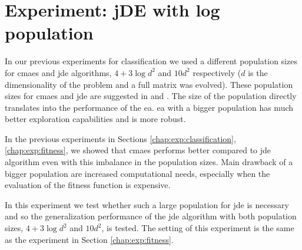 \documentclass[12pt,a4paper]{report}
\begin{document}

\section{Experiment: jDE with log population}
In our previous experiments for classification we used a different population sizes for \ac{cmaes} and \ac{jde} algorithms, $4+3\log{d^2}$ and $10d^2$ respectively ($d$ is the dimensionality of the problem and a full matrix was evolved). These population sizes for \ac{cmaes} and \ac{jde} are suggested in \cite{hansen2001completely} and \cite{brest2006self}. The size of the population directly translates into the performance of the \acl{ea}. \ac{ea} with a bigger population has much better exploration capabilities and is more robust.

In the previous experiments in Sections \ref{chap:exp:classification}, \ref{chap:exp:fitness}, we showed that \ac{cmaes} performs better compared to \ac{jde} algorithm \cite{fukui2013evolutionary} even with this imbalance in the population sizes. Main drawback of a bigger population are increased computational needs, especially when the evaluation of the fitness function is expensive.

In this experiment we test whether such a large population for \ac{jde} is necessary and so the generalization performance of the \ac{jde} algorithm with both population sizes, $4+3\log{d^2}$ and $10d^2$, is tested. The setting of this experiment is the same as the experiment in Section \ref{chap:exp:fitness}.
\end{document}
